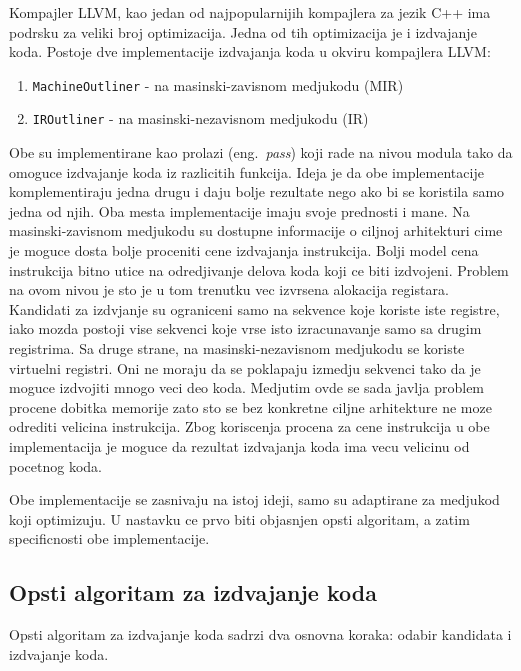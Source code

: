 \documentclass[12pt,oneside]{memoir}
\begin{document}
Kompajler LLVM, kao jedan od najpopularnijih kompajlera za jezik C++ ima podrsku za veliki broj optimizacija.
Jedna od tih optimizacija je i izdvajanje koda.
Postoje dve implementacije izdvajanja koda u okviru kompajlera LLVM:
\begin{enumerate}
  \item \verb|MachineOutliner| - na masinski-zavisnom medjukodu (MIR) \cite{paquette2016machineoutliner} %
  \item \verb|IROutliner| - na masinski-nezavisnom medjukodu (IR) \cite{litteken2020iroutliner} %
\end{enumerate}
Obe su implementirane kao prolazi (eng.~{\em pass}) koji rade na nivou modula tako da omoguce izdvajanje koda iz razlicitih funkcija.
Ideja je da obe implementacije komplementiraju jedna drugu i daju bolje rezultate nego ako bi se koristila samo jedna od njih.
Oba mesta implementacije imaju svoje prednosti i mane.
Na masinski-zavisnom medjukodu su dostupne informacije o ciljnoj arhitekturi cime je moguce dosta bolje proceniti cene izdvajanja instrukcija.
Bolji model cena instrukcija bitno utice na odredjivanje delova koda koji ce biti izdvojeni.
Problem na ovom nivou je sto je u tom trenutku vec izvrsena alokacija registara.
Kandidati za izdvjanje su ograniceni samo na sekvence koje koriste iste registre, iako mozda postoji vise sekvenci koje vrse isto izracunavanje samo sa drugim registrima.
Sa druge strane, na masinski-nezavisnom medjukodu se koriste virtuelni registri.
Oni ne moraju da se poklapaju izmedju sekvenci tako da je moguce izdvojiti mnogo veci deo koda.
Medjutim ovde se sada javlja problem procene dobitka memorije zato sto se bez konkretne ciljne arhitekture ne moze odrediti velicina instrukcija.
Zbog koriscenja procena za cene instrukcija u obe implementacija je moguce da rezultat izdvajanja koda ima vecu velicinu od pocetnog koda.

Obe implementacije se zasnivaju na istoj ideji, samo su adaptirane za medjukod koji optimizuju.
U nastavku ce prvo biti objasnjen opsti algoritam, a zatim specificnosti obe implementacije.

\subsection{Opsti algoritam za izdvajanje koda}

Opsti algoritam za izdvajanje koda sadrzi dva osnovna koraka: odabir kandidata i izdvajanje koda.
\end{document}
